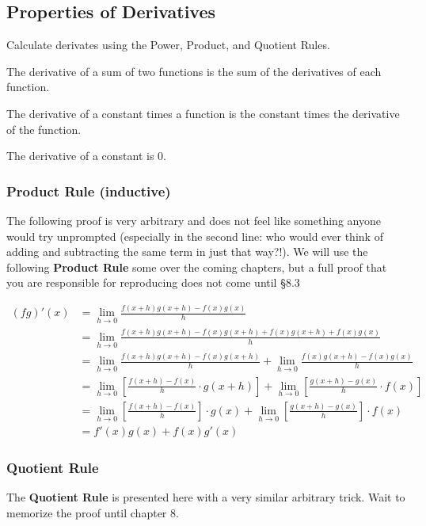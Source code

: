 
\subsection{Properties of Derivatives}
\begin{objective}
Calculate derivates using the Power, Product, and Quotient Rules.
\end{objective}

The derivative of a sum of two functions is the sum of the derivatives of each function.

The derivative of a constant times a function is the constant times the derivative of the function.

The derivative of a constant is 0.

\subsubsection{Product Rule (inductive)}
The following proof is very arbitrary and does not feel like something anyone would try
unprompted (especially in the second line: who would ever think of adding and subtracting the same
term in just that way?!).  We will use the following \textbf{Product Rule} some over the coming chapters,
but a full proof that you are responsible for reproducing does not come until §8.3

\begin{align*}
  (fg)'(x) & = \lim_{h\rightarrow0}\frac{f(x+h)g(x+h) - f(x)g(x)}{h} \\
  	&= \lim_{h\rightarrow0}\frac{f(x+h)g(x+h) - f(x)g(x+h) + f(x)g(x+h) + f(x)g(x)}{h} \\
	&= \lim_{h\rightarrow0}\frac{f(x+h)g(x+h) - f(x)g(x+h)}{h} + \lim_{h\rightarrow0}\frac{f(x)g(x+h)-f(x)g(x)}{h} \\
	&= \lim_{h\rightarrow0}\left[\frac{f(x+h) - f(x)}{h} \cdot g(x+h)\right] + \lim_{h\rightarrow0}\left[\frac{g(x+h)-g(x)}{h} \cdot f(x)\right] \\
	&= \lim_{h\rightarrow0}\left[\frac{f(x+h) - f(x)}{h}\right] \cdot g(x) + \lim_{h\rightarrow0}\left[\frac{g(x+h)-g(x)}{h}\right] \cdot f(x)\\
	&=f'(x)g(x) + f(x)g'(x)
\end{align*}

\subsubsection{Quotient Rule}
The \textbf{Quotient Rule} is presented here with a very similar arbitrary trick.  Wait to memorize the proof until chapter 8.

